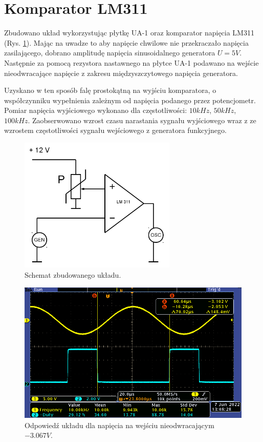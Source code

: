 \section{Komparator LM311}
Zbudowano układ wykorzystując płytkę UA-1 oraz komparator napięcia LM311 (Rys. \ref{sh1}).
Mając na uwadze to aby napięcie chwilowe nie przekraczało napięcia zasilającego, dobrano amplitudę napięcia sinusoidalnego generatora \(U=5V\).
Następnie za pomocą rezystora nastawnego na płytce UA-1 podawano na wejście nieodwracające napięcie z zakresu międzyszczytowego napięcia generatora.

Uzyskano w ten sposób falę prostokątną na wyjściu komparatora, o współczynniku wypełnienia zależnym od napięcia podanego przez potencjometr.
Pomiar napięcia wyjściowego wykonano dla częstotliwości: \(10kHz\), \(50kHz\), \(100kHz\). Zaobserwowano wzrost czasu narastania sygnału wyjściowego wraz z ze wzrostem częstotliwości sygnału wejściowego z generatora funkcyjnego.

\begin{figure}[H]
    \centering
    \includegraphics[width=7.5cm]{include/1/1.png}
    \caption{Schemat zbudowanego układu.}
    \label{sh1}
\end{figure}

\begin{figure}[H]
    \centering
    \includegraphics[width=\textwidth]{include/1/2.png}
    \caption{Odpowiedź układu dla napięcia na wejściu nieodwracającym \(-3.067V\).}
\end{figure}

